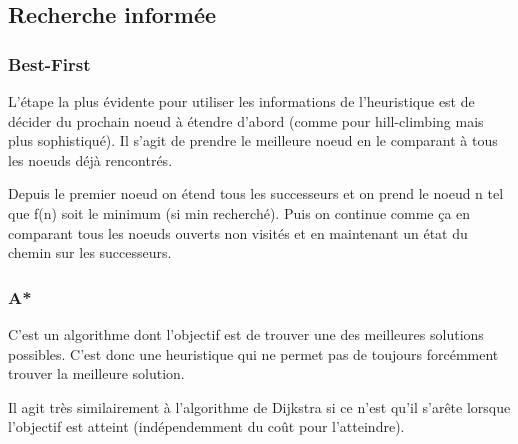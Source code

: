 \subsection{Recherche informée}

\subsubsection{Best-First}
L'étape la plus évidente pour utiliser les informations de l'heuristique est de décider du prochain noeud à étendre d'abord (comme pour hill-climbing mais plus sophistiqué).
Il s'agit de prendre le meilleure noeud en le comparant à tous les noeuds déjà rencontrés.

Depuis le premier noeud on étend tous les successeurs et on prend le noeud n tel que f(n) soit le minimum (si min recherché). Puis on continue comme ça en comparant tous les noeuds ouverts non visités et en maintenant un état du chemin sur les successeurs.

\subsubsection{A*}
C'est un algorithme dont l'objectif est de trouver une des meilleures solutions possibles. C'est donc une heuristique qui ne permet pas de toujours forcémment trouver la meilleure solution.

Il agit très similairement à l'algorithme de Dijkstra si ce n'est qu'il s'arête lorsque l'objectif est atteint (indépendemment du coût pour l'atteindre).





